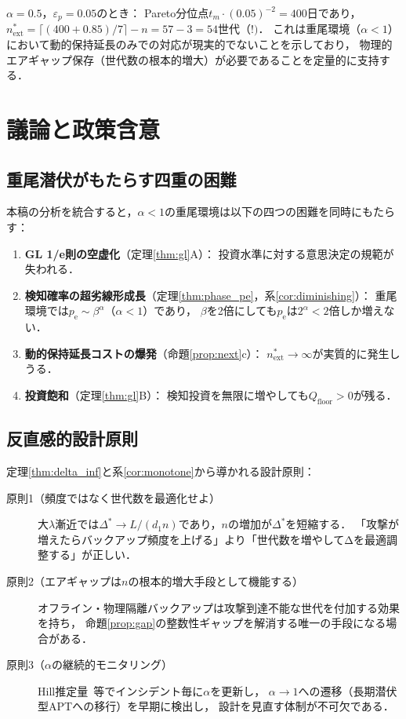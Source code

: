 \documentclass[12pt,a4paper]{article}
\theoremstyle{plain}
\theoremstyle{definition}
\theoremstyle{remark}
\newcommand{\pe}{p_{\mathrm{e}}}
\newcommand{\Dopt}{\Delta^{*}}
\begin{document}
$\alpha=0.5$，$\varepsilon_p=0.05$のとき：
Pareto分位点$t_m\cdot(0.05)^{-2}=400$日であり，
$n_{\mathrm{ext}}^*=\lceil(400+0.85)/7\rceil-n=57-3=54$世代（$!)$．
これは重尾環境（$\alpha<1$）において動的保持延長のみでの対応が現実的でないことを示しており，
物理的エアギャップ保存（世代数の根本的増大）が必要であることを定量的に支持する．

\section{議論と政策含意}
\label{sec:discussion}

\subsection{重尾潜伏がもたらす四重の困難}

本稿の分析を統合すると，$\alpha<1$の重尾環境は以下の四つの困難を同時にもたらす：

\begin{enumerate}
\item \textbf{GL 1/e則の空虚化}（定理\ref{thm:gl}A）：
  投資水準に対する意思決定の規範が失われる．

\item \textbf{検知確率の超劣線形成長}（定理\ref{thm:phase_pe}，系\ref{cor:diminishing}）：
  重尾環境では$\pe\sim\beta^\alpha$（$\alpha<1$）であり，
  $\beta$を2倍にしても$\pe$は$2^\alpha<2$倍しか増えない．

\item \textbf{動的保持延長コストの爆発}（命題\ref{prop:next}c）：
  $n_{\mathrm{ext}}^*\to\infty$が実質的に発生しうる．

\item \textbf{投資飽和}（定理\ref{thm:gl}B）：
  検知投資を無限に増やしても$Q_{\mathrm{floor}}>0$が残る．
\end{enumerate}

\subsection{反直感的設計原則}

定理\ref{thm:delta_inf}と系\ref{cor:monotone}から導かれる設計原則：

\begin{description}
\item[原則1（頻度ではなく世代数を最適化せよ）]
  大$\lambda$漸近では$\Dopt\to L/(d_1 n)$であり，$n$の増加が$\Dopt$を短縮する．
  「攻撃が増えたらバックアップ頻度を上げる」より「世代数を増やしてΔを最適調整する」が正しい．

\item[原則2（エアギャップは$n$の根本的増大手段として機能する）]
  オフライン・物理隔離バックアップは攻撃到達不能な世代を付加する効果を持ち，
  命題\ref{prop:gap}の整数性ギャップを解消する唯一の手段になる場合がある．

\item[原則3（$\alpha$の継続的モニタリング）]
  Hill推定量~\cite{hill1975}等でインシデント毎に$\alpha$を更新し，
  $\alpha\to1$への遷移（長期潜伏型APTへの移行）を早期に検出し，
  設計を見直す体制が不可欠である．
\end{description}
\end{document}
